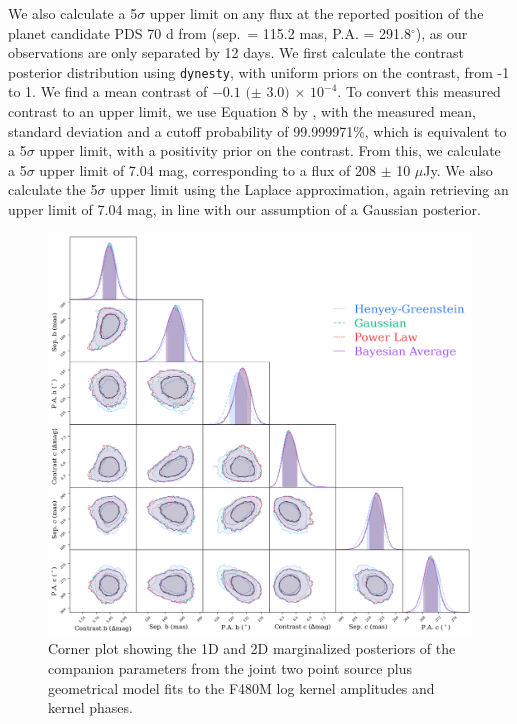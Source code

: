 \documentclass[11pt,twocolumn,twocolappendix]{aastex631}
\begin{document}
We also calculate a 5$\sigma$ upper limit on any flux at the reported position of the planet candidate PDS 70 d from \cite{2024arXiv240304855C} (sep.\ = 115.2 mas, P.A. = 291.8$^{\circ}$), as our observations are only separated by 12 days. We first calculate the contrast posterior distribution using \texttt{dynesty}, with uniform priors on the contrast, from -1 to 1. {We find a mean contrast of $-0.1$ $(\pm$ $3.0)$ $\times$ $10^{-4}$. To convert this measured contrast to an upper limit, we use Equation 8 by \cite{2018AJ....156..196R}, with the measured mean, standard deviation and a cutoff probability of 99.999971\%, which is equivalent to a 5$\sigma$ upper limit, with a positivity prior on the contrast. From this, we calculate a 5$\sigma$ upper limit of 7.04 mag, corresponding to a flux of 208 $\pm$ 10 $\mu$Jy. We also calculate the 5$\sigma$ upper limit using the Laplace approximation, again retrieving an upper limit of 7.04 mag, in line with our assumption of a Gaussian posterior}.%

\begin{figure}
\centering
\includegraphics[width=0.9\linewidth]{corner_revNEW2.png}%
\caption{Corner plot showing the 1D and 2D marginalized posteriors of the companion parameters from the joint two point source plus geometrical model {fits to the F480M log kernel amplitudes and kernel phases.}%
 }
\label{fig:f480M_corner}
\end{figure}
\end{document}
